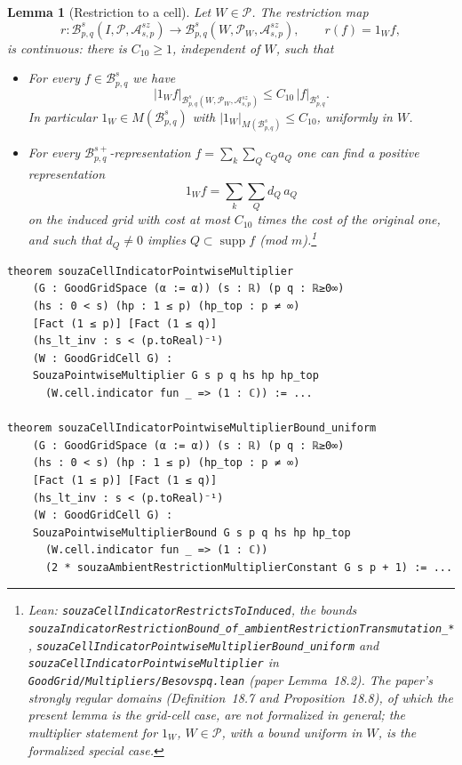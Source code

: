 \documentclass[11pt]{amsart}
\newtheorem{lemma}[theorem]{Lemma}
\theoremstyle{definition}
\newcommand{\lean}[1]{\texttt{#1}}
\begin{document}
\begin{lemma}[Restriction to a cell]\label{incint3}
Let $W\in \mathcal{P}$. The restriction map
$$r\colon \mathcal{B}^s_{p,q}(I, \mathcal{P}, \mathcal{A}^{sz}_{s,p})\rightarrow \mathcal{B}^s_{p,q}(W, \mathcal{P}_W, \mathcal{A}^{sz}_{s,p}),
\qquad r(f)=1_Wf,$$
is continuous: there is $C_{10} \geq 1$, independent of $W$, such that
\begin{itemize}
\item[A.] For every $f \in \mathcal{B}^s_{p,q}$ we have
$$|1_Wf|_{\mathcal{B}^s_{p,q}(W, \mathcal{P}_W, \mathcal{A}^{sz}_{s,p})}\leq C_{10}\, |f|_{\mathcal{B}^s_{p,q}}.$$
In particular $1_W\in M(\mathcal{B}^s_{p,q})$ with
$|1_W|_{M(\mathcal{B}^s_{p,q})} \le C_{10}$, uniformly in $W$.
\item[B.] For every $\mathcal{B}^{s+}_{p,q}$-representation
$f=\sum_{k}\sum_{Q} c_Qa_Q$ one can find a positive representation
$$1_Wf= \sum_{k}\sum_{Q} d_Q\,a_Q$$
on the induced grid with cost at most
$C_{10}$ times the cost of the original one, and such that $d_Q\neq 0$
implies $Q\subset \operatorname{supp} f$ (mod $m$).\footnote{Lean: \lean{souzaCellIndicatorRestrictsToInduced}, the bounds
\lean{souzaIndicatorRestrictionBound\_of\_ambientRestrictionTransmutation\_*},
\lean{souzaCellIndicatorPointwiseMultiplierBound\_uniform} and
\lean{souzaCellIndicatorPointwiseMultiplier} in
\lean{GoodGrid/Multipliers/Besovspq.lean} (paper Lemma~18.2). The paper's
strongly regular domains (Definition~18.7 and Proposition~18.8), of which the
present lemma is the grid-cell case, are not formalized in general; the
multiplier statement for $1_W$, $W \in \mathcal{P}$, with a bound uniform in
$W$, is the formalized special case.}
\end{itemize}
\end{lemma}
\begin{lstlisting}[style=lean]
theorem souzaCellIndicatorPointwiseMultiplier
    (G : GoodGridSpace (α := α)) (s : ℝ) (p q : ℝ≥0∞)
    (hs : 0 < s) (hp : 1 ≤ p) (hp_top : p ≠ ∞)
    [Fact (1 ≤ p)] [Fact (1 ≤ q)]
    (hs_lt_inv : s < (p.toReal)⁻¹)
    (W : GoodGridCell G) :
    SouzaPointwiseMultiplier G s p q hs hp hp_top
      (W.cell.indicator fun _ => (1 : ℂ)) := ...

theorem souzaCellIndicatorPointwiseMultiplierBound_uniform
    (G : GoodGridSpace (α := α)) (s : ℝ) (p q : ℝ≥0∞)
    (hs : 0 < s) (hp : 1 ≤ p) (hp_top : p ≠ ∞)
    [Fact (1 ≤ p)] [Fact (1 ≤ q)]
    (hs_lt_inv : s < (p.toReal)⁻¹)
    (W : GoodGridCell G) :
    SouzaPointwiseMultiplierBound G s p q hs hp hp_top
      (W.cell.indicator fun _ => (1 : ℂ))
      (2 * souzaAmbientRestrictionMultiplierConstant G s p + 1) := ...
\end{lstlisting}
\end{document}
